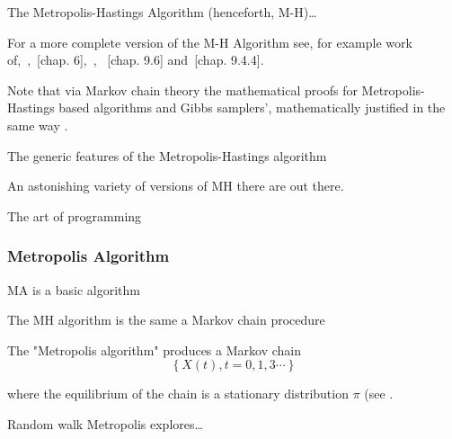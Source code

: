 \documentclass[a4paper,11pt,english]{article}
\begin{document}
		The Metropolis-Hastings Algorithm (henceforth, M-H)\ldots						
						
		For a more complete version of the M-H Algorithm see, for example work of,~\citep{chib},~\citep{gamerman}[chap. 6],~\cite{metropolis},
		~\citep{lee}[chap. 9.6] and~\citep{prochazka}[chap. 9.4.4].
			
		Note that via Markov chain theory the mathematical proofs for Metropolis-Hastings based algorithms and Gibbs samplers', mathematically 
		justified in the same way \citep[p.~1]{casella}.   
			
		The generic features of the Metropolis-Hastings algorithm
			
		An astonishing variety of versions of MH there are out there.			

		The art of programming 
						
			\subsubsection{Metropolis Algorithm}
			
			MA is a basic algorithm
			
			The MH algorithm is the same a Markov chain procedure 			
			

			
			The "Metropolis algorithm" produces a Markov chain 
			\begin{equation*}
				\left\{X\left(t\right), t=0,1,3\cdots \right\}				
			\end{equation*}						

			\noindent where the equilibrium of the chain is a stationary distribution $\pi$ (see \citep[p.731]{geman}. 
			
			Random walk Metropolis explores\ldots 

			
			
			
\end{document}
